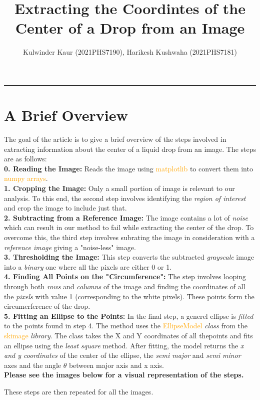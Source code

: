 \documentclass{article}
\author{Kulwinder Kaur (2021PHS7190), Harikesh Kushwaha (2021PHS7181)}
\title{\textbf{Extracting the Coordintes of the Center of a Drop from an Image}}
\date{}
\begin{document}
\maketitle
\hrule
\section*{A Brief Overview}
The goal of the article is to give a brief overview of the steps involved in extracting information about the center of a liquid drop from an image. The steps are as follows:\\
\textbf{0. Reading the Image:} Reads the image using \textcolor{orange}{matplotlib} to convert them into \textcolor{orange}{numpy arrays}.\\
\textbf{1. Cropping the Image:} Only a small portion of image is relevant to our analysis. To this end, the second step involves identifying the \textit{region of interest} and crop the image to include just that. \\
\textbf{2. Subtracting from a Reference Image:} The image contains a lot of \textit{noise} which can result in our method to fail while extracting the center of the drop. To overcome this, the third step involves subrating the image in consideration with a \textit{reference image} giving a "noise-less" image.\\
\textbf{3. Thresholding the Image:} This step converts the subtracted \textit{grayscale} image into a \textit{binary} one where all the pixels are either 0 or 1.\\
\textbf{4. Finding All Points on the "Circumference":} The step involves looping through both \textit{rows} and \textit{columns} of the image and finding the coordinates of all the \textit{pixels} with value 1 (corresponding to the white pixels). These points form the circumerference of the drop.\\
\textbf{5. Fitting an Ellipse to the Points:} In the final step, a generel ellipse is \textit{fitted} to the points found in step 4. The method uses the \textcolor{orange}{EllipseModel} \textit{class} from the \textcolor{orange}{skimage} \textit{library}. The class takes the X and Y coordinates of all thepoints and fits an ellipse using the \textit{least square} method. After fitting, the model returns the \textit{x and y coordinates} of the center of the ellipse, the \textit{semi major} and \textit{semi minor} axes and the angle $\mathit{\theta}$ between major axis and x axis.\\
\textbf{Please see the images below for a visual representation of the steps.}\\
\begin{flushleft}
  These steps are then repeated for all the images.
\end{flushleft}
\end{document}
